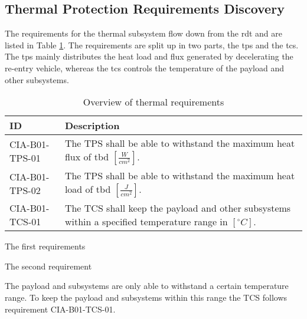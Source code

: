 \subsection{Thermal Protection Requirements Discovery} \label{sec:therm}
The requirements for the thermal subsystem flow down from the \gls{rdt} and are listed in Table \ref{tab:thermalreq}. The requirements are split up in two parts, the \gls{tps} and the \gls{tcs}. The \gls{tps} mainly distributes the heat load and flux generated by decelerating the re-entry vehicle, whereas the \gls{tcs} controls the temperature of the payload and other subsystems.


\begin{table}[H]
	\caption{Overview of thermal requirements}
	\begin{tabular}{|p{}|p{}|}
    \hline
    ID          & Description                                                                                                      \\ \hline \hline
    CIA-B01-TPS-01 & The TPS shall be able to withstand the maximum heat flux of \gls{tbd} $ \left[\frac{W}{cm^2}\right] $.               
\\ \hline
    CIA-B01-TPS-02 &  The TPS shall be able to withstand the maximum heat load of \gls{tbd} $ \left[\frac{J}{cm^2}\right] $.                
\\ \hline
    CIA-B01-TCS-01 & The TCS shall keep the payload and other subsystems within a specified temperature range in $\left[^{\circ}C\right]$.                                            
\\ \hline
    \end{tabular}
    \label{tab:thermalreq}
\end{table}

The first requirements 

The second requirement

The payload and subsystems are only able to withstand a certain temperature range. To keep the payload and subsystems within this range the TCS follows requirement CIA-B01-TCS-01.